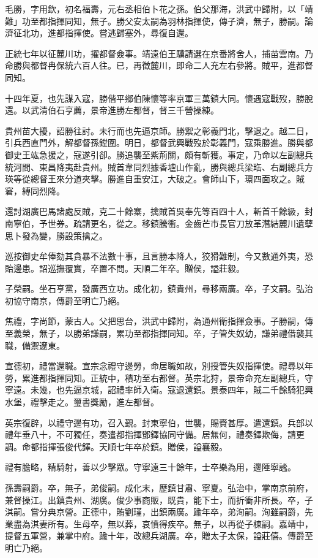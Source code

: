 \begin{pinyinscope}
毛勝，字用欽，初名福壽，元右丞相伯卜花之孫。伯父那海，洪武中歸附，以「靖難」功至都指揮同知，無子。勝父安太嗣為羽林指揮使，傳子濟，無子，勝嗣。論濟征北功，進都指揮使。嘗逃歸塞外，尋復自還。

正統七年以征麓川功，擢都督僉事。靖遠伯王驥請選在京番將舍人，捕苗雲南。乃命勝與都督冉保統六百人往。已，再徵麓川，即命二人充左右參將。賊平，進都督同知。

十四年夏，也先謀入寇，勝偕平鄉伯陳懷等率京軍三萬鎮大同。懷遇寇戰歿，勝脫還。以武清伯石亨薦，景帝進勝左都督，督三千營操練。

貴州苗大擾，詔勝往討。未行而也先逼京師。勝禦之彰義門北，擊退之。越二日，引兵西直門外，解都督孫鏜圍。明日，都督武興戰歿於彰義門，寇乘勝進。勝與都御史王竑急援之，寇遂引卻。勝追襲至紫荊關，頗有斬獲。事定，乃命以左副總兵統河間、東昌降夷赴貴州。賊首韋同烈據香壚山作亂，勝與總兵梁珤、右副總兵方瑛等從總督王來分道夾擊。勝進自重安江，大破之。會師山下，環四面攻之。賊窘，縛同烈降。

還討湖廣巴馬諸處反賊，克二十餘寨，擒賊首吳奉先等百四十人，斬首千餘級，封南寧伯，予世券。疏請更名，從之。移鎮騰衝。金齒芒市長官刀放革潛結麓川遺孽思卜發為變，勝設策擒之。

巡按御史牟俸劾其貪暴不法數十事，且言勝本降人，狡猾難制，今又數通外夷，恐貽邊患。詔巡撫覆實，卒置不問。天順二年卒。贈侯，謚莊毅。

子榮嗣。坐石亨黨，發廣西立功。成化初，鎮貴州，尋移兩廣。卒，子文嗣。弘治初協守南京，傳爵至明亡乃絕。

焦禮，字尚節，蒙古人。父把思台，洪武中歸附，為通州衛指揮僉事。子勝嗣，傳至義榮，無子，以勝弟謙嗣，累功至都指揮同知。卒，子管失奴幼，謙弟禮借襲其職，備禦遼東。

宣德初，禮當還職。宣宗念禮守邊勞，命居職如故，別授管失奴指揮使。禮尋以年勞，累進都指揮同知。正統中，積功至右都督。英宗北狩，景帝命充左副總兵，守寧遠。未幾，也先逼京城，詔禮率師入衛。寇退還鎮。景泰四年，賊二千餘騎犯興水堡，禮擊走之。璽書獎勵，進左都督。

英宗復辟，以禮守邊有功，召入覲。封東寧伯，世襲，賜賚甚厚。遣還鎮。兵部以禮年垂八十，不可獨任，奏遣都指揮鄧鐸協同守備。居無何，禮奏鐸欺侮，請更調。命都指揮張俊代鐸。天順七年卒於鎮。贈侯，謚襄毅。

禮有膽略，精騎射，善以少擊眾。守寧遠三十餘年，士卒樂為用，邊陲寧謐。

孫壽嗣爵。卒，無子，弟俊嗣。成化末，歷鎮甘肅、寧夏。弘治中，掌南京前府，兼督操江。出鎮貴州、湖廣。俊少事商販，既貴，能下士，而折衝非所長。卒，子淇嗣。嘗分典京營。正德中，賄劉瑾，出鎮兩廣。踰年卒，弟洵嗣。洵雖嗣爵，先業盡為淇妻所有。生母卒，無以葬，哀憤得疾卒。無子，以再從子棟嗣。嘉靖中，提督五軍營，兼掌中府。踰十年，改總兵湖廣。卒，贈太子太保，謚莊僖。傳爵至明亡乃絕。


\end{pinyinscope}

